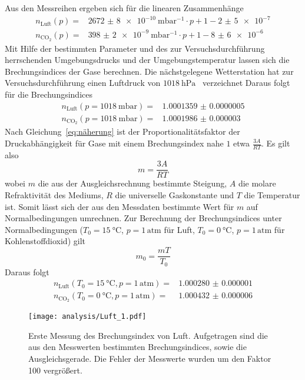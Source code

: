 Aus den Messreihen ergeben sich für die linearen Zusammenhänge
\begin{align}
  n_{\text{Luft}}(p)=&\SI{2672(8)e-10}{\milli\bar^{-1}}
  \cdot p+1-\num{2(5)e-7} \\
  n_{\text{CO}_2}(p)=&\SI{398(2)e-9}{\milli\bar^{-1}}
  \cdot p+1-\num{8(6)e-6}
\end{align}
Mit Hilfe der bestimmten Parameter und des zur Versuchsdurchführung herrschenden
Umgebungsdrucks und der Umgebungstemperatur lassen sich die Brechungsindices der
Gase berechnen. Die nächstgelegene Wetterstation hat zur Versuchsdurchführung
einen Luftdruck von $\SI{1018}{\hecto\pascal}$~\cite{wetteronline} verzeichnet
Daraus folgt für die Brechungsindices
\begin{align}
  n_{\text{Luft}}(p=\SI{1018}{\milli\bar})=&\num{1.0001359(5)} \\
  n_{\text{CO}_2}(p=\SI{1018}{\milli\bar})=&\num{1.0001986(30)}
\end{align}
Nach Gleichung~\eqref{eq:näherung} ist der Proportionalitätsfaktor
der Druckabhängigkeit für Gase mit einem Brechungsindex nahe $1$ etwa
$\frac{3A}{RT}$. Es gilt also
\begin{equation}
  m=\frac{3A}{RT}
\end{equation}
wobei $m$ die aus der Ausgleichsrechnung bestimmte Steigung, $A$ die molare
Refraktivität des Mediums, $R$ die universelle Gaskonstante und $T$ die
Temperatur ist. Somit lässt sich der aus den Messdaten bestimmte Wert für $m$
auf Normalbedingungen umrechnen. Zur Berechnung der Brechungsindices unter
Normalbedingungen ($T_0=\SI{15}{\celsius}$, $p=1\,\text{atm}$ für Luft,
$T_0=\SI{0}{\celsius}$, $p=1\,\text{atm}$ für Kohlenstoffdioxid) gilt
\begin{equation}
  m_0=\frac{mT}{T_0}
\end{equation}
Daraus folgt
\begin{align}
  n_{\text{Luft}}(T_0=\SI{15}{\celsius}, p=1\,\text{atm})=&\num{1.000280(1)} \\
  n_{\text{CO}_2}(T_0=\SI{0}{\celsius}, p=1\,\text{atm})=&\num{1.000432(6)}
\end{align}

\begin{figure}[htb]
  \centering
  \texttt{[image: analysis/Luft\_1.pdf]}
  \caption{Erste Messung des Brechungsindex von Luft. Aufgetragen sind die aus
  den Messwerten bestimmten Brechungsindices, sowie die Ausgleichsgerade. Die
  Fehler der Messwerte wurden um den Faktor 100 vergrößert.}
  \label{fig:luft1}
\end{figure}


